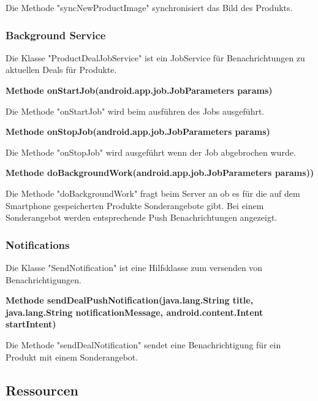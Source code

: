 \documentclass{scrartcl}
\begin{document}
\noindent Die Methode "syncNewProductImage" synchronisiert das Bild des Produkts. \newline 

\subsubsection{Background Service}
Die Klasse "ProductDealJobService" ist ein JobService für Benachrichtungen zu aktuellen Deals für Produkte. \newline 

\noindent\textbf{Methode onStartJob(android.app.job.JobParameters params)}

\noindent Die Methode "onStartJob" wird beim ausführen des Jobs ausgeführt. \newline 

\noindent\textbf{Methode onStopJob(android.app.job.JobParameters params)}

\noindent Die Methode "onStopJob" wird ausgeführt wenn der Job abgebrochen wurde. \newline 

\noindent\textbf{Methode doBackgroundWork(android.app.job.JobParameters params))}

\noindent Die Methode "doBackgroundWork" fragt beim Server an ob es für die auf dem Smartphone gespeicherten Produkte Sonderangebote gibt. Bei einem Sonderangebot werden entsprechende Push Benachrichtungen angezeigt. \newline 

\subsubsection{Notifications}
Die Klasse "SendNotification" ist eine Hilfsklasse zum versenden von Benachrichtigungen. \newline 

\noindent\textbf{Methode sendDealPushNotification(java.lang.String title, \newline         java.lang.String notificationMessage,                                    android.content.Intent startIntent)}

\noindent Die Methode "sendDealNotification" sendet eine Benachrichtigung für ein Produkt mit einem Sonderangebot. \newline 

\subsection{Ressourcen}
\end{document}
